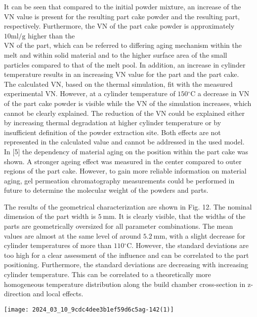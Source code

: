 \documentclass[10pt]{article}
\begin{document}
It can be seen that compared to the initial powder mixture, an increase of the VN value is present for the resulting part cake powder and the resulting part, respectively. Furthermore, the VN of the part cake powder is approximately $10 \mathrm{ml} / \mathrm{g}$ higher than the\\
$\mathrm{VN}$ of the part, which can be referred to differing aging mechanism within the melt and within solid material and to the higher surface area of the small particles compared to that of the melt pool. In addition, an increase in cylinder temperature results in an increasing VN value for the part and the part cake. The calculated VN, based on the thermal simulation, fit with the measured experimental VN. However, at a cylinder temperature of $150{ }^{\circ} \mathrm{C}$ a decrease in $\mathrm{VN}$ of the part cake powder is visible while the $\mathrm{VN}$ of the simulation increases, which cannot be clearly explained. The reduction of the VN could be explained either by increasing thermal degradation at higher cylinder temperature or by insufficient definition of the powder extraction site. Both effects are not represented in the calculated value and cannot be addressed in the used model. In [5] the dependency of material aging on the position within the part cake was shown. A stronger ageing effect was measured in the center compared to outer regions of the part cake. However, to gain more reliable information on material aging, gel permeation chromatography measurements could be performed in future to determine the molecular weight of the powders and parts.

The results of the geometrical characterization are shown in Fig. 12. The nominal dimension of the part width is $5 \mathrm{~mm}$. It is clearly visible, that the widths of the parts are geometrically oversized for all parameter combinations. The mean values are almost at the same level of around $5.2 \mathrm{~mm}$, with a slight decrease for cylinder temperatures of more than $110{ }^{\circ} \mathrm{C}$. However, the standard deviations are too high for a clear assessment of the influence and can be correlated to the part positioning. Furthermore, the standard deviations are decreasing with increasing cylinder temperature. This can be correlated to a theoretically more homogeneous temperature distribution along the build chamber cross-section in z-direction and local effects.

\begin{center}
\texttt{[image: 2024\_03\_10\_9cdc4dee3b1ef59d6c5ag-142(1)]}
\end{center}
\end{document}
